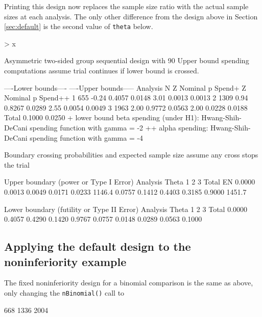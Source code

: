 Printing this design now replaces the sample size ratio with the actual sample sizes at each analysis. The only other difference from the design above in Section \ref{sec:default} is the second value of \texttt{theta} below.

\begin{Schunk}
\begin{Sinput}
> x
\end{Sinput}
\begin{Soutput}
Asymmetric two-sided group sequential design with
90 % power and 2.5 % Type I Error.
Upper bound spending computations assume
trial continues if lower bound is crossed.

                  ----Lower bounds----  ----Upper bounds-----
  Analysis   N    Z   Nominal p Spend+  Z   Nominal p Spend++
         1  655 -0.24    0.4057 0.0148 3.01    0.0013  0.0013
         2 1309  0.94    0.8267 0.0289 2.55    0.0054  0.0049
         3 1963  2.00    0.9772 0.0563 2.00    0.0228  0.0188
     Total                      0.1000                 0.0250 
+ lower bound beta spending (under H1):
 Hwang-Shih-DeCani spending function with gamma = -2
++ alpha spending:
 Hwang-Shih-DeCani spending function with gamma = -4

Boundary crossing probabilities and expected sample size
assume any cross stops the trial

Upper boundary (power or Type I Error)
          Analysis
   Theta      1      2      3  Total   E{N}
  0.0000 0.0013 0.0049 0.0171 0.0233 1146.4
  0.0757 0.1412 0.4403 0.3185 0.9000 1451.7

Lower boundary (futility or Type II Error)
          Analysis
   Theta      1      2      3  Total
  0.0000 0.4057 0.4290 0.1420 0.9767
  0.0757 0.0148 0.0289 0.0563 0.1000
\end{Soutput}
\end{Schunk}

\subsection{Applying the default design to the noninferiority example}
The fixed noninferiority design for a binomial comparison is the same as above, only changing the \texttt{nBinomial()} call to 

\begin{Schunk}
\begin{Soutput}
[1]  668 1336 2004
\end{Soutput}
\end{Schunk}

